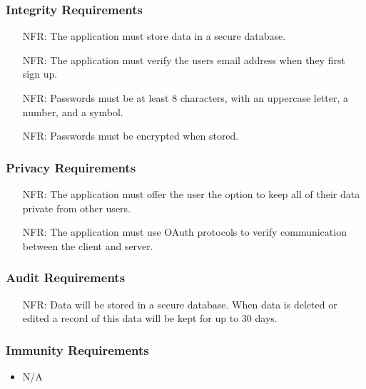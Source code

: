 \documentclass[12pt]{article}
\newcounter{nfrnum} %
\begin{document}
  \subsubsection{Integrity Requirements}
    \noindent \begin{itemize}
      \item[NFR\refstepcounter{nfrnum}\thenfrnum:]
        The application must store data in a secure database.
      \item[NFR\refstepcounter{nfrnum}\thenfrnum:]
        The application must verify the users email address when they first sign up.
      \item[NFR\refstepcounter{nfrnum}\thenfrnum:]
        Passwords must be at least 8 characters, with an uppercase letter, a number, and a symbol.
      \item[NFR\refstepcounter{nfrnum}\thenfrnum:]
       Passwords must be encrypted when stored.
    \end{itemize}

  \subsubsection{Privacy Requirements}
    \noindent \begin{itemize}
      \item[NFR\refstepcounter{nfrnum}\thenfrnum:]
        The application must offer the user the option to keep all of their data private from other users.
      \item[NFR\refstepcounter{nfrnum}\thenfrnum:]
        The application must use OAuth protocols to verify communication between the client and server.
    \end{itemize}

  \subsubsection{Audit Requirements}
    \noindent \begin{itemize}
      \item[NFR\refstepcounter{nfrnum}\thenfrnum:]
        Data will be stored in a secure database. When data is deleted or edited a record of this data will be kept for up to 30 days.
    \end{itemize}
  \subsubsection{Immunity Requirements}
    \noindent \begin{itemize}
      \item N/A
    \end{itemize}
\end{document}
